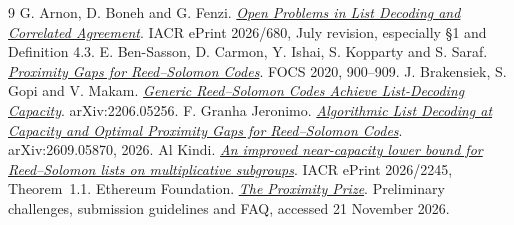 \documentclass[11pt,letterpaper]{article}
\begin{document}
\begingroup\small
\begin{thebibliography}{9}\setlength{\itemsep}{2pt}
 G. Arnon, D. Boneh and G. Fenzi. \href{https://eprint.iacr.org/2026/680}{\emph{Open Problems in List Decoding and Correlated Agreement}}. IACR ePrint 2026/680, July revision, especially \S1 and Definition 4.3.
 E. Ben-Sasson, D. Carmon, Y. Ishai, S. Kopparty and S. Saraf. \href{https://eccc.weizmann.ac.il/report/2020/083/}{\emph{Proximity Gaps for Reed--Solomon Codes}}. FOCS 2020, 900--909.
 J. Brakensiek, S. Gopi and V. Makam. \href{https://arxiv.org/abs/2206.05256}{\emph{Generic Reed--Solomon Codes Achieve List-Decoding Capacity}}. arXiv:2206.05256.
 F. Granha Jeronimo. \href{https://arxiv.org/abs/2609.05870}{\emph{Algorithmic List Decoding at Capacity and Optimal Proximity Gaps for Reed--Solomon Codes}}. arXiv:2609.05870, 2026.
 Al Kindi. \href{https://eprint.iacr.org/2026/2245}{\emph{An improved near-capacity lower bound for Reed--Solomon lists on multiplicative subgroups}}. IACR ePrint 2026/2245, Theorem~1.1.
 Ethereum Foundation. \href{https://proximityprize.org/}{\emph{The Proximity Prize}}. Preliminary challenges, submission guidelines and FAQ, accessed 21 November 2026.
\end{thebibliography}
\endgroup
\end{document}
